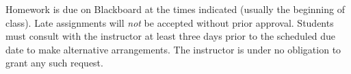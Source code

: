 Homework is due on Blackboard at the times indicated (usually the beginning of class).  Late assignments will {\em not} be accepted without
prior approval.  Students must consult with the instructor at least
three days prior to the scheduled due date to make alternative
arrangements.  The instructor is under no obligation to grant any such
request.
